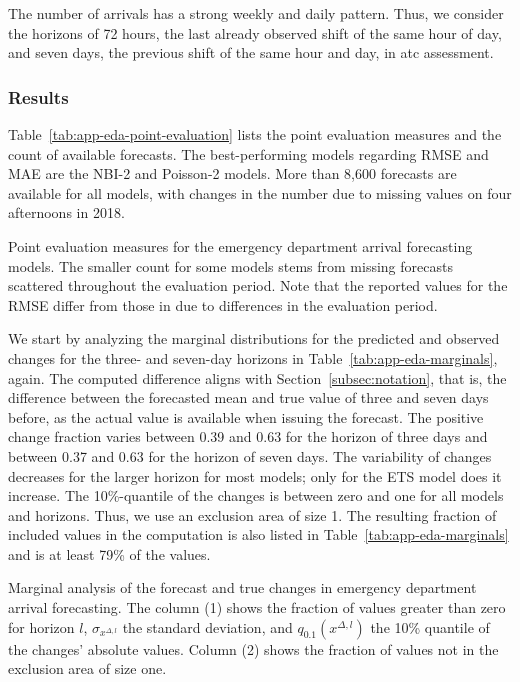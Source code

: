 \documentclass[pdflatex]{sn-jnl}
\theoremstyle{plain}%
\theoremstyle{definition}
\begin{document}
The number of arrivals has a strong weekly and daily pattern.
Thus, we consider the horizons of 72 hours, the last already observed shift of the same hour of day, and seven days, the previous shift of the same hour and day, in \ac{atc} assessment.

\subsubsection*{Results}

Table~\ref{tab:app-eda-point-evaluation} lists the point evaluation measures and the count of available forecasts.
The best-performing models regarding RMSE and MAE are the NBI-2 and Poisson-2 models.
More than 8,600 forecasts are available for all models, with changes in the number due to missing values on four afternoons in 2018.

\begin{table}
\centering

\caption[Point evaluation measures for the emergency department arrival forecasting models.]{Point evaluation measures for the emergency department arrival forecasting models. The smaller count for some models stems from missing forecasts scattered throughout the evaluation period. Note that the reported values for the RMSE differ from those in \citet{Rostami-Tabar2023} due to differences in the evaluation period.}\label{tab:app-eda-point-evaluation}
\end{table}

We start by analyzing the marginal distributions for the predicted and observed changes for the three- and seven-day horizons in Table~\ref{tab:app-eda-marginals}, again.
The computed difference aligns with Section~\ref{subsec:notation}, that is, the difference between the forecasted mean and true value of three and seven days before, as the actual value is available when issuing the forecast.
The positive change fraction varies between 0.39 and 0.63 for the horizon of three days and between 0.37 and 0.63 for the horizon of seven days.
The variability of changes decreases for the larger horizon for most models; only for the ETS model does it increase.
The 10\%-quantile of the changes is between zero and one for all models and horizons.
Thus, we use an exclusion area of size 1.
The resulting fraction of included values in the computation is also listed in Table~\ref{tab:app-eda-marginals} and is at least 79\% of the values.

\begin{table}
    \centering
    \tiny
    
    \caption[Marginal analysis of the forecast and true changes in emergency department arrival forecasting.]{Marginal analysis of the forecast and true changes in emergency department arrival forecasting. The column (1) shows the fraction of values greater than zero for horizon $l$, $\sigma_{x^{\Delta, l}}$ the standard deviation, and $q_{0.1} (x^{\Delta, l})$ the 10\% quantile of the changes' absolute values. Column (2) shows the fraction of values not in the exclusion area of size one.}
    \label{tab:app-eda-marginals}
\end{table}
\end{document}
